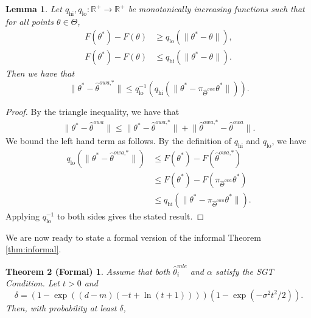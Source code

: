 \documentclass[twoside]{article}
\newtheorem{lemma}{Lemma}
\newcommand{\qhi}{q_\text{hi}}
\newcommand{\qlo}{q_\text{lo}}
\newcommand{\W}{{\hat \Theta^{\textit{owa}}}}
\newcommand{\E}{\mathbb{E}}
\newcommand{\w}{\theta}
\newcommand{\wowa}{\hat\w^{owa}}
\newcommand{\wowastar}{\hat\w^{\textit{owa,*}}}
\newcommand{\wmle}{\hat\w^{mle}}
\newcommand{\wstar}{{\w^{*}}}
\newcommand{\ltwo}[1]{{\lVert {#1} \rVert}}
\newcommand{\proj}[1]{\pi_{{#1}}}
\begin{document}
\begin{lemma}
Let $\qhi,\qlo : \mathbb{R}^+ \to \mathbb{R}^+$ be monotonically increasing functions such that for all points $\w\in\Theta$,
\begin{align}
F(\wstar) - F(\w) &\ge \qlo \left( \ltwo {\wstar - \w} \right)
,
\\
F(\wstar) - F(\w) &\le \qhi \left( \ltwo {\wstar - \w} \right)
.
\end{align}
Then we have that
\begin{equation}
\ltwo {\wstar-\wowastar}
\le
\qlo^{-1} \left(
    \qhi \left( \ltwo {\wstar - \proj\W\wstar} \right)
\right)
.
\end{equation}
\end{lemma}

\begin{proof}
By the triangle inequality, we have that
\begin{align}
\ltwo{\wstar-\wowa}
\le
\ltwo{\wstar-\wowastar} + \ltwo{\wowastar-\wowa}
.
\end{align}
We bound the left hand term as follows.
By the definition of $\qhi$ and $\qlo$, we have
\begin{align}
\qlo \left( \ltwo {\wstar-\wowastar} \right)
&\le F(\wstar) - F(\wowastar)
\\
&\le F(\wstar) - F(\proj\W\wstar)
\\
&\le \qhi \left( \ltwo {\wstar - \proj\W\wstar} \right)
.
\end{align}
Applying $\qlo^{-1}$ to both sides gives the stated result.
\end{proof}


We are now ready to state a formal version of the informal Theorem \ref{thm:informal}.

\newtheorem*{theoremformal}{Theorem 2 (Formal)}
\begin{theoremformal}
Assume that both $\wmle_i$ and $\alpha$ satisfy the SGT Condition.
Let $t>0$ and
\begin{equation}
\delta = (1-\exp((d-m)(-t+\ln(t+1))))(1-\exp(-\sigma^2t^2/2))
.
\end{equation}
Then, with probability at least $\delta$,
\begin{equation}
\begin{aligned}
\end{aligned}
\end{equation}
\end{theoremformal}
\end{document}
